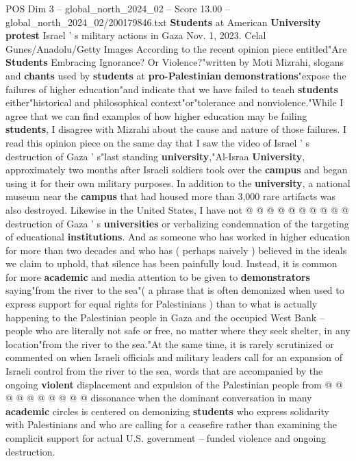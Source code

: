 \begin{textsample}{POS Dim 3 – global\_north\_2024\_02 – Score 13.00 – global\_north\_2024\_02/200179846.txt}  \label{ex:f3_pos_251}
\textbf{Students} at American \textbf{University} \textbf{protest} Israel ' s military actions in Gaza Nov. 1, 2023.
Celal Gunes/Anadolu/Getty Images According to the recent opinion piece entitled"Are \textbf{Students} Embracing Ignorance?
Or Violence?"written by Moti Mizrahi, slogans and \textbf{chants} used by \textbf{students} at \textbf{pro-Palestinian} \textbf{demonstrations}"expose the failures of higher education"and indicate that we have failed to teach \textbf{students} either"historical and philosophical context"or"tolerance and nonviolence."While I agree that we can find examples of how higher education may be failing \textbf{students}, I disagree with Mizrahi about the cause and nature of those failures.
I read this opinion piece on the same day that I saw the video of Israel ' s destruction of Gaza ' s"last standing \textbf{university},"Al-Israa \textbf{University}, approximately two months after Israeli soldiers took over the \textbf{campus} and began using it for their own military purposes.
In addition to the \textbf{university}, a national museum near the \textbf{campus} that had housed more than 3,000 rare artifacts was also destroyed.
Likewise in the United States, I have not @ @ @ @ @ @ @ @ @ @ destruction of Gaza ' s \textbf{universities} or verbalizing condemnation of the targeting of educational \textbf{institutions}.
And as someone who has worked in higher education for more than two decades and who has ( perhaps naively ) believed in the ideals we claim to uphold, that silence has been painfully loud.
Instead, it is common for more \textbf{academic} and media attention to be given to \textbf{demonstrators} saying"from the river to the sea"( a phrase that is often demonized when used to express support for equal rights for Palestinians ) than to what is actually happening to the Palestinian people in Gaza and the occupied West Bank -- people who are literally not safe or free, no matter where they seek shelter, in any location"from the river to the sea."At the same time, it is rarely scrutinized or commented on when Israeli officials and military leaders call for an expansion of Israeli control from the river to the sea, words that are accompanied by the ongoing \textbf{violent} displacement and expulsion of the Palestinian people from @ @ @ @ @ @ @ @ @ @ dissonance when the dominant conversation in many \textbf{academic} circles is centered on demonizing \textbf{students} who express solidarity with Palestinians and who are calling for a ceasefire rather than examining the complicit support for actual U.S. government -- funded violence and ongoing destruction.

\end{textsample}
